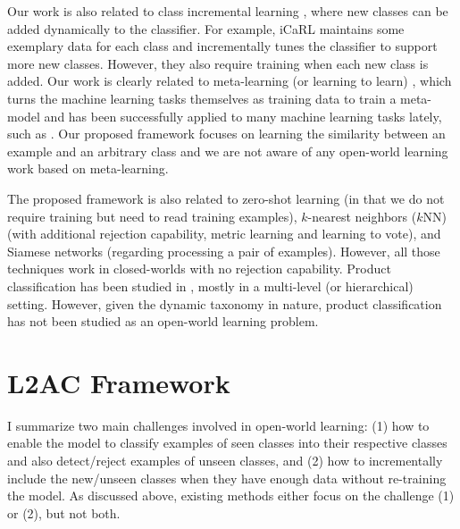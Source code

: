 Our work is also related to class incremental learning \cite{rebuffi2017icarl,rusu2016progressive,lee2017lifelong}, where new classes can be added dynamically to the classifier. For example, 
iCaRL \cite{rebuffi2017icarl} maintains some exemplary data for each class and incrementally tunes the classifier to support more new classes. However, they also require training when each new class is added. 
Our work is clearly related to meta-learning (or learning to learn) \cite{thrun2012learning}, 
which turns the machine learning tasks themselves as training data to train a meta-model and has been successfully applied to many machine learning tasks lately, such as 
\cite{andrychowicz2016learning,fernando2017pathnet,finn2017model,finn2018probabilistic,fan2018learning}.
Our proposed framework focuses on learning the similarity between an example and an arbitrary class
and we are not aware of any open-world learning work based on meta-learning. 

The proposed framework is also related to zero-shot learning \cite{lampert2009learning,palatucci2009zero,socher2013zero} (in that we do not require training but need to read training examples), 
$k$-nearest neighbors ($k$NN) (with additional rejection capability, metric learning \cite{xing2003distance} and learning to vote), 
and Siamese networks \cite{bromley1994signature,koch2015siamese,vinyals2016matching} (regarding processing a pair of examples). 
However, all those techniques work in closed-worlds with no rejection capability.
Product classification has been studied in \cite{shen2011item,shen2012large,chen2013cost,gupta2016product,cevahir2016large,kozareva2015everyone}, mostly in a multi-level (or hierarchical) setting. 
However, given the dynamic taxonomy in nature, product classification has not been studied as an open-world learning problem.

\section{L2AC Framework}
I summarize two main challenges involved in open-world learning: (1) how to enable the model to classify examples of seen classes into their respective classes and also detect/reject examples of unseen classes, and (2) how to incrementally include the new/unseen classes when they have enough data without re-training the model.
As discussed above, existing methods either focus on the challenge (1) or (2), but not both.

